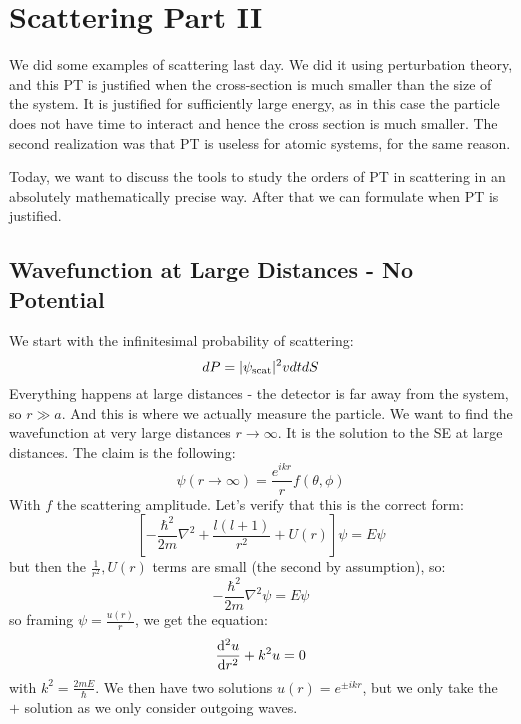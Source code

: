 \section{Scattering Part II}
We did some examples of scattering last day. We did it using perturbation theory, and this PT is justified when the cross-section is much smaller than the size of the system. It is justified for sufficiently large energy, as in this case the particle does not have time to interact and hence the cross section is much smaller. The second realization was that PT is useless for atomic systems, for the same reason.

Today, we want to discuss the tools to study the orders of PT in scattering in an absolutely mathematically precise way. After that we can formulate when PT is justified.

\subsection{Wavefunction at Large Distances - No Potential}
We start with the infinitesimal probability of scattering:
\begin{equation}
    dP = \lvert \psi_{\text{scat}} \rvert^2 vdt dS
\end{equation}
Everything happens at large distances - the detector is far away from the system, so $r \gg a$. And this is where we actually measure the particle. We want to find the wavefunction at very large distances $r \to \infty$. It is the solution to the SE at large distances. The claim is the following:
\begin{equation}
    \psi(r \to \infty) = \frac{e^{ikr}}{r}f(\theta, \phi)
\end{equation}
With $f$ the scattering amplitude. Let's verify that this is the correct form:
\begin{equation}
    \left[-\frac{\hbar^2}{2m}\nabla^2 + \frac{l(l+1)}{r^2} + U(r)\right] \psi = E\psi
\end{equation}
but then the $\frac{1}{r^2}, U(r)$ terms are small (the second by assumption), so:
\begin{equation}
    -\frac{\hbar^2}{2m}\nabla^2 \psi = E\psi
\end{equation}
so framing $\psi = \frac{u(r)}{r}$, we get the equation:
\begin{equation}
    \dod[2]{u}{r} + k^2 u = 0
\end{equation}
with $k^2 = \frac{2mE}{\hbar}$. We then have two solutions $u(r) = e^{\pm ikr}$, but we only take the $+$ solution as we only consider outgoing waves.

